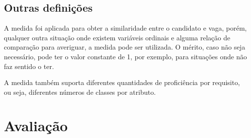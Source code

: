 \documentclass[preprint,12pt]{elsarticle}
\begin{document}
    

\subsection{Outras definições}

A medida foi aplicada para obter a similaridade entre o candidato e vaga, porém, qualquer outra situação onde existem variáveis ordinais e alguma relação de comparação para averiguar, a medida pode ser utilizada. O mérito, caso não seja necessário, pode ter o valor constante de 1, por exemplo, para situações onde não faz sentido o ter.

A medida também suporta diferentes quantidades de proficiência por requisito, ou seja, diferentes números de classes por atributo.

\section{Avaliação}
\label{sec:sample4}
\end{document}
